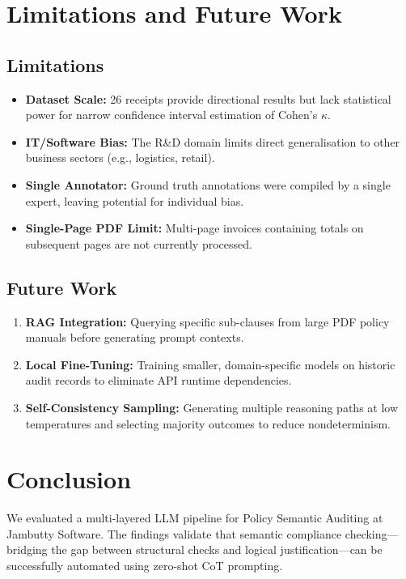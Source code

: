 \documentclass[11pt,a4paper]{article}
\begin{document}
\section{Limitations and Future Work}

\subsection{Limitations}
\begin{itemize}
    \item \textbf{Dataset Scale:} 26 receipts provide directional results but lack statistical power for narrow confidence interval estimation of Cohen's $\kappa$.
    \item \textbf{IT/Software Bias:} The R\&D domain limits direct generalisation to other business sectors (e.g., logistics, retail).
    \item \textbf{Single Annotator:} Ground truth annotations were compiled by a single expert, leaving potential for individual bias.
    \item \textbf{Single-Page PDF Limit:} Multi-page invoices containing totals on subsequent pages are not currently processed.
\end{itemize}

\subsection{Future Work}
\begin{enumerate}
    \item \textbf{RAG Integration:} Querying specific sub-clauses from large PDF policy manuals before generating prompt contexts.
    \item \textbf{Local Fine-Tuning:} Training smaller, domain-specific models on historic audit records to eliminate API runtime dependencies.
    \item \textbf{Self-Consistency Sampling:} Generating multiple reasoning paths at low temperatures and selecting majority outcomes to reduce nondeterminism.
\end{enumerate}

\section{Conclusion}
We evaluated a multi-layered LLM pipeline for Policy Semantic Auditing at Jambutty Software. The findings validate that semantic compliance checking---bridging the gap between structural checks and logical justification---can be successfully automated using zero-shot CoT prompting. 
\end{document}
